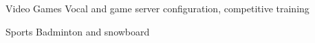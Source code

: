 
\begin{cvskills}

	\cvskill
	{Video Games}
    {Vocal and game server configuration, competitive training}

	\cvskill
	{Sports}
    {Badminton and snowboard}

\end{cvskills}
